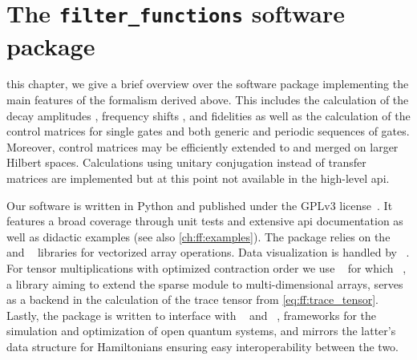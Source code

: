 \chapter{The \texttt{filter\_functions} software package}\label{ch:ff:software}
 this chapter, we give a brief overview over the \filterfunctions software package implementing the main features of the formalism derived above.
This includes the calculation of the decay amplitudes \decayamps, frequency shifts \freqshifts, and fidelities as well as the calculation of the control matrices for single gates and both generic and periodic sequences of gates.
Moreover, control matrices may be efficiently extended to and merged on larger Hilbert spaces.
Calculations using unitary conjugation instead of transfer matrices are implemented but at this point not available in the high-level \gls{api}.

Our software is written in Python and published under the GPLv3 license~\cite{Hangleiter_ff}.
It features a broad coverage through unit tests and extensive \gls{api} documentation as well as didactic examples (see also \cref{ch:ff:examples}).
The package relies on the \numpy~\cite{Harris2020} and \scipy~\cite{Virtanen2020} libraries for vectorized array operations.
Data visualization is handled by \matplotlib~\cite{Hunter2007}.
For tensor multiplications with optimized contraction order we use \opteinsum~\cite{Smith2018} for which \sparse~\cite{Pydata2019}, a library aiming to extend the \scipy sparse module to multi-dimensional arrays, serves as a backend in the calculation of the trace tensor from \cref{eq:ff:trace_tensor}.
Lastly, the package is written to interface with \qopt~\cite{Teske2022} and \qutip~\cite{Johansson2012}, frameworks for the simulation and optimization of open quantum systems, and mirrors the latter's data structure for Hamiltonians ensuring easy interoperability between the two.

